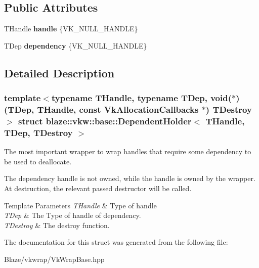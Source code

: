 \subsection*{Public Attributes}
\begin{DoxyCompactItemize}
\item 
\mbox{\label{structblaze_1_1vkw_1_1base_1_1DependentHolder_a880cec3d6c3f427a492372e0a7fe2589}} 
T\+Handle {\bfseries handle} \{V\+K\+\_\+\+N\+U\+L\+L\+\_\+\+H\+A\+N\+D\+LE\}
\item 
\mbox{\label{structblaze_1_1vkw_1_1base_1_1DependentHolder_abfec06cf5378b9e9263f1e3f335eeb93}} 
T\+Dep {\bfseries dependency} \{V\+K\+\_\+\+N\+U\+L\+L\+\_\+\+H\+A\+N\+D\+LE\}
\end{DoxyCompactItemize}


\subsection{Detailed Description}
\subsubsection*{template$<$typename T\+Handle, typename T\+Dep, void($\ast$)(\+T\+Dep, T\+Handle, const Vk\+Allocation\+Callbacks $\ast$) T\+Destroy$>$\newline
struct blaze\+::vkw\+::base\+::\+Dependent\+Holder$<$ T\+Handle, T\+Dep, T\+Destroy $>$}

The most important wrapper to wrap handles that require some dependency to be used to deallocate. 

The dependency handle is not owned, while the handle is owned by the wrapper. At destruction, the relevant passed destructor will be called.


\begin{DoxyTemplParams}{Template Parameters}
{\em T\+Handle} & Type of handle \\
\hline
{\em T\+Dep} & The Type of handle of dependency. \\
\hline
{\em T\+Destroy} & The destroy function. \\
\hline
\end{DoxyTemplParams}


The documentation for this struct was generated from the following file\+:\begin{DoxyCompactItemize}
\item 
Blaze/vkwrap/Vk\+Wrap\+Base.\+hpp\end{DoxyCompactItemize}
